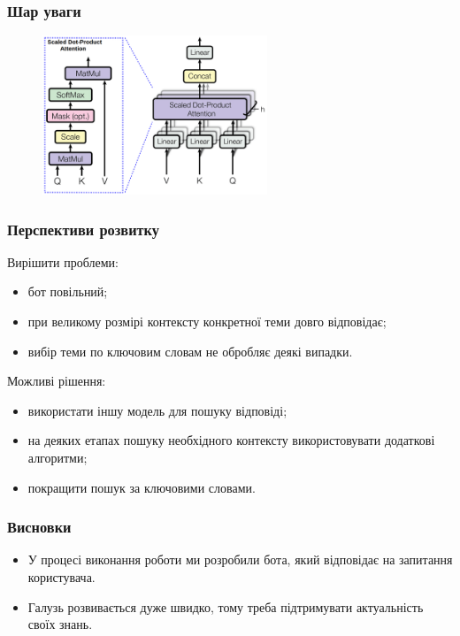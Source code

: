 \documentclass{beamer}
\begin{document}
\begin{frame}
    \frametitle{Шар уваги}
    \begin{figure}[H]
        \centering
        \includegraphics[width=0.6\textwidth]{attention_layer.png}
    \end{figure}
\end{frame}

\begin{frame}
    \frametitle{Перспективи розвитку}
    Вирішити проблеми:

    \begin{itemize}
        \item бот повільний;
        \item при великому розмірі контексту конкретної теми довго відповідає;
        \item вибір теми по ключовим словам не обробляє деякі випадки.
    \end{itemize}

    Можливі рішення:
    
    \begin{itemize}
        \item використати іншу модель для пошуку відповіді;
        \item на деяких етапах пошуку необхідного контексту використовувати додаткові алгоритми;
        \item покращити пошук за ключовими словами.
    \end{itemize}
\end{frame}

\begin{frame}
    \frametitle{Висновки}

    \begin{itemize}
        \item У процесі виконання роботи ми розробили бота, який відповідає на запитання користувача.
        \item Галузь розвивається дуже швидко, тому треба підтримувати актуальність своїх знань.
    \end{itemize}

\end{frame}
\end{document}
